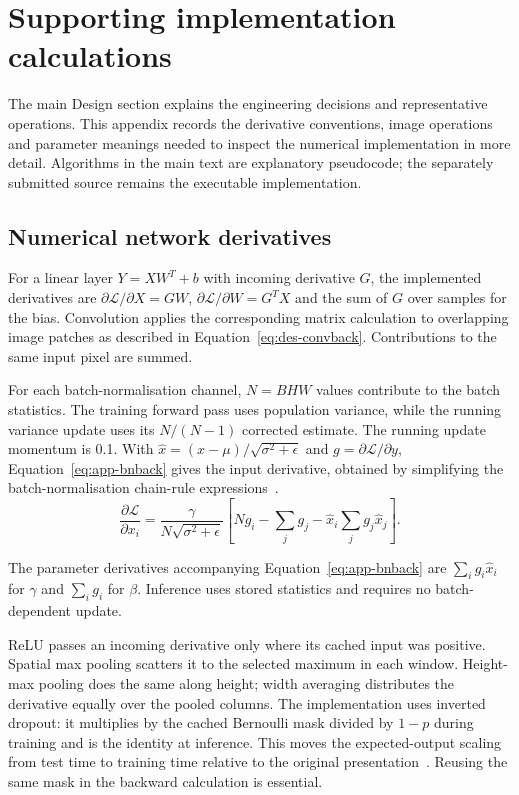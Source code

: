 \section{Supporting implementation calculations}
\label{app:des-implementation}
The main Design section explains the engineering decisions and representative operations. This appendix records the derivative conventions, image operations and parameter meanings needed to inspect the numerical implementation in more detail. Algorithms in the main text are explanatory pseudocode; the separately submitted source remains the executable implementation.

\subsection{Numerical network derivatives}
\label{app:des-derivatives}
For a linear layer $Y=XW^T+b$ with incoming derivative $G$, the implemented derivatives are $\partial\mathcal L/\partial X=GW$, $\partial\mathcal L/\partial W=G^TX$ and the sum of $G$ over samples for the bias. Convolution applies the corresponding matrix calculation to overlapping image patches as described in Equation~\ref{eq:des-convback}. Contributions to the same input pixel are summed.


For each batch-normalisation channel, $N=BHW$ values contribute to the batch statistics. The training forward pass uses population variance, while the running variance update uses its $N/(N-1)$ corrected estimate. The running update momentum is 0.1. With $\widehat x=(x-\mu)/\sqrt{\sigma^2+\epsilon}$ and $g=\partial\mathcal L/\partial y$, Equation~\ref{eq:app-bnback} gives the input derivative, obtained by simplifying the batch-normalisation chain-rule expressions~\cite[PDF p.~4]{ioffe2015}.
\begin{equation}
\frac{\partial\mathcal L}{\partial x_i}=
\frac{\gamma}{N\sqrt{\sigma^2+\epsilon}}
\left[Ng_i-\sum_jg_j-\widehat x_i\sum_jg_j\widehat x_j\right].
\label{eq:app-bnback}
\end{equation}


The parameter derivatives accompanying Equation~\ref{eq:app-bnback} are $\sum_i g_i\widehat x_i$ for $\gamma$ and $\sum_i g_i$ for $\beta$. Inference uses stored statistics and requires no batch-dependent update.

ReLU passes an incoming derivative only where its cached input was positive. Spatial max pooling scatters it to the selected maximum in each window. Height-max pooling does the same along height; width averaging distributes the derivative equally over the pooled columns. The implementation uses inverted dropout: it multiplies by the cached Bernoulli mask divided by $1-p$ during training and is the identity at inference. This moves the expected-output scaling from test time to training time relative to the original presentation~\cite[pp.~1931, 1934]{srivastava2014}. Reusing the same mask in the backward calculation is essential.

